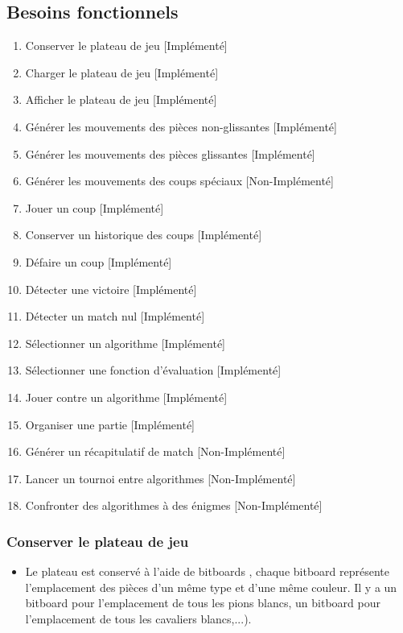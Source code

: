 \huge\documentclass{article}
\begin{document}
\subsection{Besoins fonctionnels}
\medskip

\begin{enumerate}
    \item Conserver le plateau de jeu \hfill[Implémenté]
    \medskip
    \item Charger le plateau de jeu \hfill[Implémenté]
    \medskip
    \item Afficher le plateau de jeu \hfill[Implémenté]
    \medskip
    \item Générer les mouvements des pièces non-glissantes \hfill[Implémenté]
    \medskip
    \item Générer les mouvements des pièces glissantes \hfill[Implémenté]
    \medskip
    \item Générer les mouvements des coups spéciaux \hfill[Non-Implémenté]
    \medskip
    \item Jouer un coup \hfill[Implémenté]
    \medskip
    \item Conserver un historique des coups \hfill[Implémenté]
    \medskip
    \item Défaire un coup \hfill[Implémenté]
    \medskip
    \item Détecter une victoire \hfill[Implémenté]
    \medskip
    \item Détecter un match nul \hfill[Implémenté]
    \medskip
    \item Sélectionner un algorithme \hfill[Implémenté]
    \medskip
    \item Sélectionner une fonction d'évaluation \hfill[Implémenté]
    \medskip
    \item Jouer contre un algorithme \hfill[Implémenté]
    \medskip
    \item Organiser une partie \hfill[Implémenté]
    \medskip
    \item Générer un récapitulatif de match \hfill[Non-Implémenté]
    \medskip
    \item Lancer un tournoi entre algorithmes \hfill[Non-Implémenté]
    \medskip
    \item Confronter des algorithmes à des énigmes \hfill[Non-Implémenté]
    \medskip
\end{enumerate}

\subsubsection{Conserver le plateau de jeu}
\medskip
\begin{itemize}
    \item Le plateau est conservé à l'aide de bitboards \cite{Bitboards}, chaque bitboard représente l'emplacement des pièces d'un même type et d'une même couleur. Il y a un bitboard pour l'emplacement de tous les pions blancs, un bitboard pour l'emplacement de tous les cavaliers blancs,...).
\end{itemize}
\newpage
\end{document}
